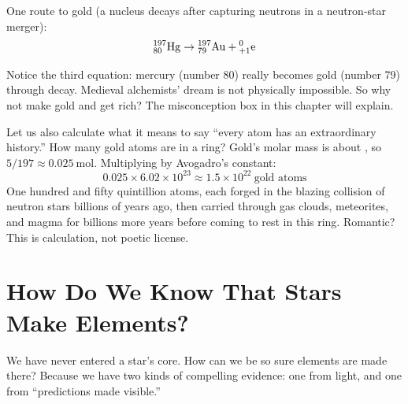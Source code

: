 One route to gold (a nucleus decays after capturing neutrons in a neutron-star merger):
\[\mathrm{^{197}_{80}Hg} \rightarrow \mathrm{^{197}_{79}Au} + \mathrm{^{0}_{+1}e}\]

Notice the third equation: mercury (number 80) really becomes gold (number 79) through decay. Medieval alchemists' dream is not physically impossible. So why not make gold and get rich? The misconception box in this chapter will explain.

Let us also calculate what it means to say ``every atom has an extraordinary history.'' How many gold atoms are in a  ring? Gold's molar mass is about , so $5/197 \approx 0.025\ \mathrm{mol}$. Multiplying by Avogadro's constant:
\[0.025 \times 6.02\times 10^{23} \approx 1.5\times 10^{22}\ \text{gold atoms}\]
One hundred and fifty quintillion atoms, each forged in the blazing collision of neutron stars billions of years ago, then carried through gas clouds, meteorites, and magma for billions more years before coming to rest in this ring. Romantic? This is calculation, not poetic license.

\section{How Do We Know That Stars Make Elements?}

We have never entered a star's core. How can we be so sure elements are made there? Because we have two kinds of compelling evidence: one from light, and one from ``predictions made visible.''

